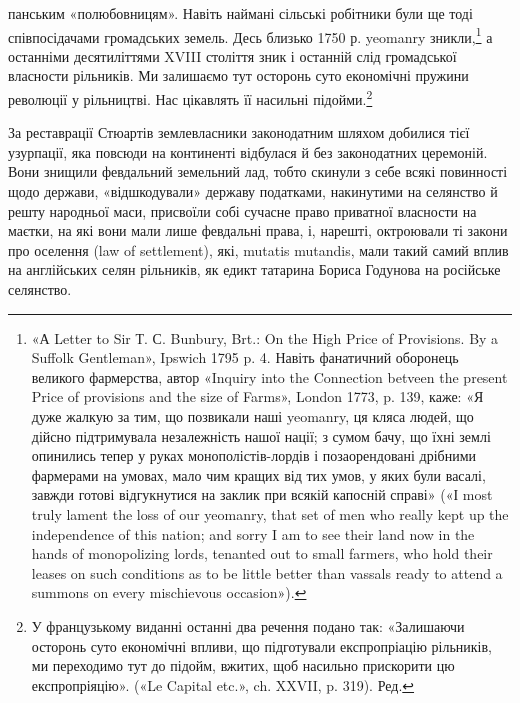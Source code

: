 \parcont{}  %
панським «полюбовницям». Навіть наймані сільські робітники
були ще тоді співпосідачами громадських земель. Десь близько
1750 р. yeomanry зникли,\footnote{
«А Letter to Sir Т. С. Bunbury, Brt.: On the High Price of Provisions.
By a Suffolk Gentleman», Ipswich 1795 p. 4. Навіть фанатичний
оборонець великого фармерства, автор «Inquiry into the Connection
betveen the present Price of provisions and the size of Farms», London
1773, p. 139, каже: «Я дуже жалкую за тим, що позвикали наші yeomanry,
ця кляса людей, що дійсно підтримувала незалежність нашої нації;
з сумом бачу, що їхні землі опинились тепер у руках монополістів-лордів
і позаорендовані дрібними фармерами на умовах, мало чим кращих від
тих умов, у яких були васалі, завжди готові відгукнутися на заклик при
всякій капосній справі» («І most truly lament the loss of our yeomanry, that
set of men who really kept up the independence of this nation; and sorry I am
to see their land now in the hands of monopolizing lords, tenanted out to
small farmers, who hold their leases on such conditions as to be little better
than vassals ready to attend a summons on every mischievous occasion»).
} а останніми десятиліттями XVIII
століття зник і останній слід громадської власности рільників.
Ми залишаємо тут осторонь суто економічні пружини революції
у рільництві. Нас цікавлять її насильні підойми.\footnote*{
У французькому виданні останні два речення подано так:
«Залишаючи осторонь суто економічні впливи, що підготували експропріацію
рільників, ми переходимо тут до підойм, вжитих, щоб насильно
прискорити цю експропріяцію». («Le Capital etc.», ch. XXVII,
p. 319). Ред.
}

За реставрації Стюартів землевласники законодатним шляхом
добилися тієї узурпації, яка повсюди на континенті відбулася й
без законодатних церемоній. Вони знищили февдальний земельний
лад, тобто скинули з себе всякі повинності щодо держави,
«відшкодували» державу податками, накинутими на селянство
й решту народньої маси, присвоїли собі сучасне право приватної
власности на маєтки, на які вони мали лише февдальні права,
і, нарешті, октроювали ті закони про оселення (law of settlement),
які, mutatis mutandis, мали такий самий вплив на англійських
селян рільників, як едикт татарина Бориса Годунова на російське
селянство.


